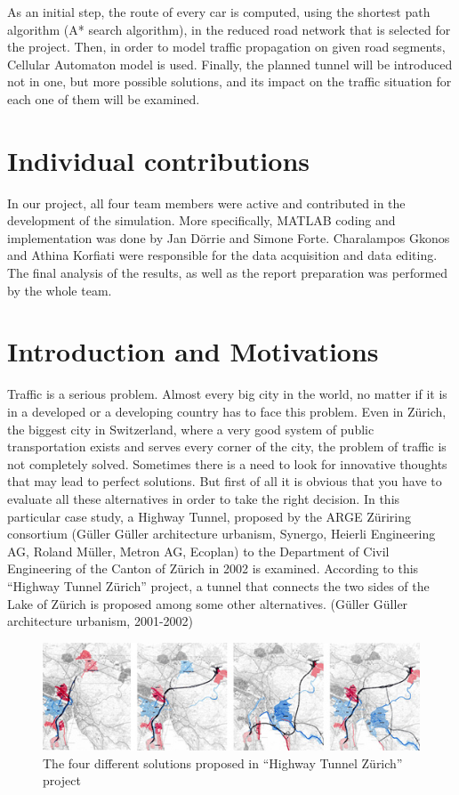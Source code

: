 \documentclass[11pt]{article}
\begin{document}
As an initial step, the route of every car is computed, using the shortest path algorithm (A* search algorithm), in the reduced road network that is selected for the project. Then, in order to model traffic propagation on given road segments, Cellular Automaton model is used. Finally, the planned tunnel will be introduced not in one, but more possible solutions, and its impact on the traffic situation for each one of them will be examined.


\section{Individual contributions}
In our project, all four team members were active and contributed in the development of the simulation. More specifically, MATLAB coding and implementation was done by Jan D\"orrie and Simone Forte. Charalampos Gkonos and Athina Korfiati were responsible for the data acquisition and data editing. The final analysis of the results, as well as the report preparation was performed by the whole team.

\section{Introduction and Motivations}
Traffic is a serious problem. Almost every big city in the world, no matter if it is in a developed or a developing country has to face this problem. Even in Z\"urich, the biggest city in Switzerland, where a very good system of public transportation exists and serves every corner of the city, the problem of traffic is not completely solved. Sometimes there is a need to look for innovative thoughts that may lead to perfect solutions. But first of all it is obvious that you have to evaluate all these alternatives in order to take the right decision. In this particular case study, a Highway Tunnel, proposed by the ARGE Z\"uriring consortium (G\"uller G\"uller architecture urbanism, Synergo, Heierli Engineering AG, Roland M\"uller, Metron AG, Ecoplan) to the Department of Civil Engineering of the Canton of Z\"urich in 2002 is examined. According to this ``Highway Tunnel Z\"urich'' project, a tunnel that connects the two sides of the Lake of Z\"urich is proposed among some other alternatives. (G\"uller G\"uller architecture urbanism, 2001-2002)

\begin{figure}[ht]
	\begin{center}
		\includegraphics[width=\linewidth]{../img/GG03_1a.jpg}
	\end{center}
	\caption{The four different solutions proposed in ``Highway Tunnel Z\"{u}rich'' project \cite{GGau}}
	\label{fig:tunnel}
\end{figure}
\end{document}
